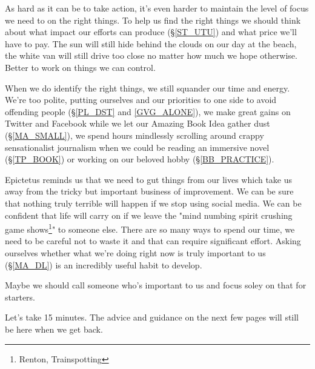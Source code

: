 \cleardoublepage
\begin{multicols}{2}

As hard as it can be to take action, it's even harder to maintain the level of focus we need to on the right things. To help us find the right things we should think about what impact our efforts can produce (\S \ref{ST_UTU}) and what price we'll have to pay. The sun will still hide behind the clouds on our day at the beach, the white van will still drive too close no matter how much we hope otherwise. Better to work on things we can control.  %

When we do identify the right things, we still squander our time and energy. We're too polite, putting ourselves and our priorities to one side to avoid offending people (\S \ref{PL_DST} and \ref{GVG_ALONE}), we make great gains on Twitter and Facebook while we let our Amazing Book Idea gather dust (\S \ref{MA_SMALL}), we spend hours mindlessly scrolling around crappy sensationalist journalism when we could be reading an immersive novel (\S \ref{TP_BOOK}) or working on our beloved hobby (\S \ref{BB_PRACTICE}). 

Epictetus reminds us that we need to gut things from our lives which take us away from the tricky but important business of improvement. We can be sure that nothing truly terrible will happen if we stop using social media. We can be confident that life will carry on if we leave the "mind numbing spirit crushing game shows\footnote{Renton, Trainspotting}" to someone else. There are so many ways to spend our time, we need to be careful not to waste it and that can require significant effort. Asking ourselves whether what we're doing right now is truly important to us (\S \ref{MA_DL}) is an incredibly useful habit to develop.

Maybe we should call someone who's important to us and focus soley on that for starters. 

Let's take 15 minutes. The advice and guidance on the next few pages will still be here when we get back. 

\end{multicols}
\clearpage
